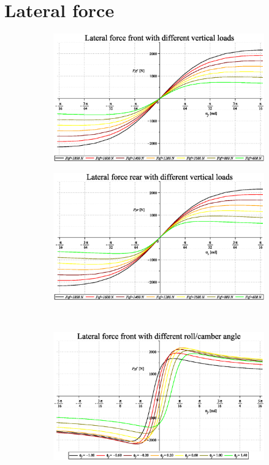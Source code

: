 \section{Lateral force}
%
\begin{figure}[hbt!]
    \begin{subfigure}{.5\textwidth}
        \includegraphics[width=\linewidth]{MotoModel_tex/MotoModelplot2d3.eps}
        \caption{}
        \label{fig:lat1a}
    \end{subfigure}%
    \begin{subfigure}{.5\textwidth}
        \includegraphics[width=\linewidth]{MotoModel_tex/MotoModelplot2d4.eps}
        \caption{}
        \label{fig:lat1b}
    \end{subfigure}\\
    \begin{subfigure}{.5\textwidth}
        \includegraphics[width=\linewidth]{MotoModel_tex/MotoModelplot2d5.eps}

\end{subfigure}
\end{figure}
